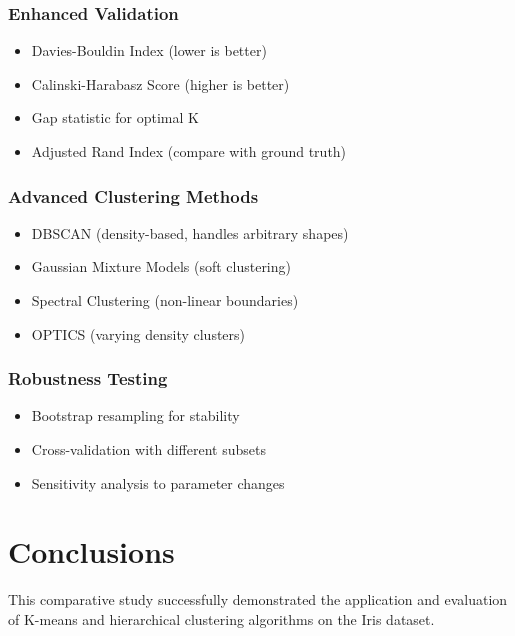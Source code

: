 \documentclass[12pt,a4paper]{article}
\begin{document}
\subsubsection{Enhanced Validation}
\begin{itemize}
    \item[$\checkmark$] Davies-Bouldin Index (lower is better)
    \item[$\checkmark$] Calinski-Harabasz Score (higher is better)
    \item[$\checkmark$] Gap statistic for optimal K
    \item[$\checkmark$] Adjusted Rand Index (compare with ground truth)
\end{itemize}

\subsubsection{Advanced Clustering Methods}
\begin{itemize}
    \item[$\checkmark$] DBSCAN (density-based, handles arbitrary shapes)
    \item[$\checkmark$] Gaussian Mixture Models (soft clustering)
    \item[$\checkmark$] Spectral Clustering (non-linear boundaries)
    \item[$\checkmark$] OPTICS (varying density clusters)
\end{itemize}

\subsubsection{Robustness Testing}
\begin{itemize}
    \item[$\checkmark$] Bootstrap resampling for stability
    \item[$\checkmark$] Cross-validation with different subsets
    \item[$\checkmark$] Sensitivity analysis to parameter changes
\end{itemize}

\newpage

\section{Conclusions}

This comparative study successfully demonstrated the application and evaluation of K-means and hierarchical clustering algorithms on the Iris dataset.
\end{document}
